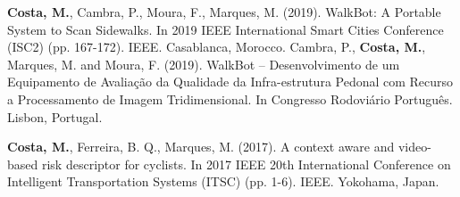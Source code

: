 
\begin{cvpublications}
  \cvpublication
    {\textbf{Costa, M.}, Cambra, P., Moura, F., Marques, M. (2019). WalkBot: A Portable System to Scan Sidewalks. In 2019 IEEE International Smart Cities Conference (ISC2) (pp. 167-172). IEEE. Casablanca, Morocco.}
  \cvpublication
    {Cambra, P., \textbf{Costa, M.}, Marques, M. and Moura, F. (2019). WalkBot – Desenvolvimento de um Equipamento de Avaliação da Qualidade da Infra-estrutura Pedonal com Recurso a Processamento de Imagem Tridimensional. In Congresso Rodoviário Português. Lisbon, Portugal.}

\end{cvpublications}


\begin{cvpublications}
  \cvpublication
    {\textbf{Costa, M.}, Ferreira, B. Q., Marques, M. (2017). A context aware and video-based risk descriptor for cyclists. In 2017 IEEE 20th International Conference on Intelligent Transportation Systems (ITSC) (pp. 1-6). IEEE. Yokohama, Japan.}

\end{cvpublications}




\begin{cvpublications}
\end{cvpublications}


